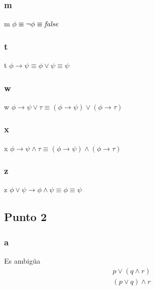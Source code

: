\documentclass{article}
\begin{document}
\subsubsection{m}
\begin{logicenv}[5]{m}
    $\phi \equiv \neg \phi \equiv \textrm{\textit{false}}$
\end{logicenv}

\subsubsection{t}
\begin{logicenv}[5]{t}
    $\phi \to \psi \equiv \phi \lor \psi \equiv \psi$
\end{logicenv}

\subsubsection{w}
\begin{logicenv}[5]{w}
    $\phi \to \psi \lor \tau \equiv (\phi \to \psi) \lor (\phi \to \tau)$
\end{logicenv}

\subsubsection{x}
\begin{logicenv}[5]{x}
    $\phi \to \psi \land \tau \equiv (\phi \to \psi) \land (\phi \to \tau)$
\end{logicenv}

\subsubsection{z}
\begin{logicenv}[5]{z}
    $\phi \lor \psi \to \phi \land \psi \equiv \phi \equiv \psi$
\end{logicenv}

\subsection{Punto 2}
\subsubsection{a}
\begin{logicenv}[5]{Es ambigüa}
    \begin{gather*}
        p \lor (q \land r)\\
        (p \lor q) \land r
    \end{gather*}
\end{logicenv}
\end{document}
